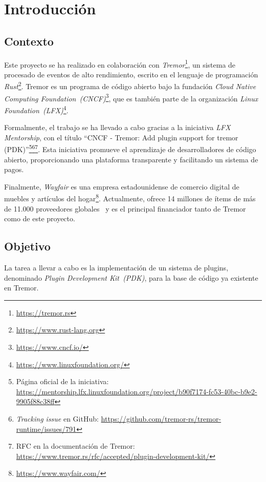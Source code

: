 
\chapter{Introducción}

\section{Contexto}

Este proyecto se ha realizado en colaboración con
\emph{Tremor}\footnote{\url{https://tremor.rs}}, un sistema de procesado de
eventos de alto rendimiento, escrito en el lenguaje de programación
\emph{Rust}\footnote{\url{https://www.rust-lang.org}}. Tremor es un programa de
código abierto bajo la fundación \emph{Cloud Native Computing
Foundation~(CNCF)}\footnote{\url{https://www.cncf.io/}}, que es también parte de
la organización \emph{Linux
Foundation~(LFX)}\footnote{\url{https://www.linuxfoundation.org/}}.

Formalmente, el trabajo se ha llevado a cabo gracias a la iniciativa \emph{LFX
Mentorship}, con el título ``CNCF - Tremor: Add plugin support for tremor
(PDK)''\footnote{Página oficial de la iniciativa:
\url{https://mentorship.lfx.linuxfoundation.org/project/b90f7174-fc53-40bc-b9e2-9905f88c38ff}}\footnote{\emph{Tracking
issue} en GitHub:
\url{https://github.com/tremor-rs/tremor-runtime/issues/791}}\footnote{RFC en la
documentación de Tremor:
\url{https://www.tremor.rs/rfc/accepted/plugin-development-kit/}}. Esta
iniciativa promueve el aprendizaje de desarrolladores de código abierto,
proporcionando una plataforma transparente y facilitando un sistema de pagos.

Finalmente, \emph{Wayfair} es una empresa estadounidense de comercio digital de
muebles y artículos del hogar\footnote{\url{https://www.wayfair.com/}}.
Actualmente, ofrece 14 millones de ítems de más de 11.000 proveedores
globales~\cite{wayfairItems} y es el principal financiador tanto de Tremor como
de este proyecto.

\section{Objetivo}

La tarea a llevar a cabo es la implementación de un sistema de plugins,
denominado \emph{Plugin Development Kit~(PDK)}, para la base de código ya
existente en Tremor.

